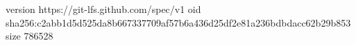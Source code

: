 version https://git-lfs.github.com/spec/v1
oid sha256:c2abb1d5d525da8b667337709af57b6a436d25df2e81a236bdbdacc62b29b853
size 786528
